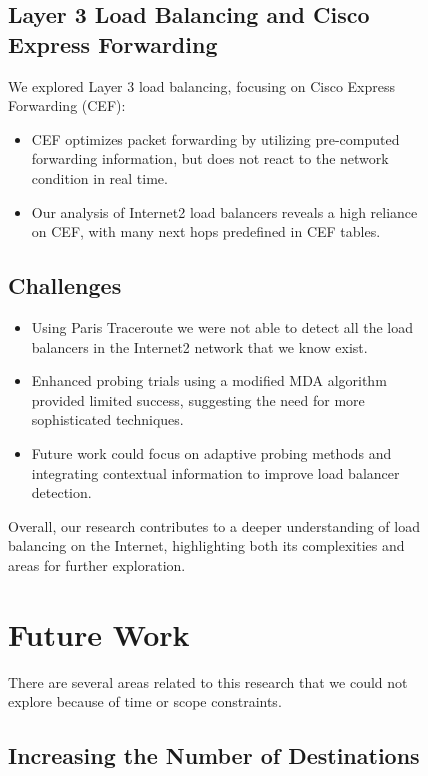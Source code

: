 \documentclass[12pt]{cwru_thesis}
\begin{document}
\begin{figure}[h!]
\begin{itemize}
\end{itemize}

\section*{Layer 3 Load Balancing and Cisco Express Forwarding}

We explored Layer 3 load balancing, focusing on Cisco Express Forwarding (CEF):
\begin{itemize}
    \item CEF optimizes packet forwarding by utilizing pre-computed forwarding information, but does not react to the network condition in real time.
    \item Our analysis of Internet2 load balancers reveals a high reliance on CEF, with many next hops predefined in CEF tables. 
\end{itemize}

\section*{Challenges}

\begin{itemize}
    \item Using Paris Traceroute we were not able to detect all the load balancers in the Internet2 network that we know exist.
    \item Enhanced probing trials using a modified MDA algorithm provided limited success, suggesting the need for more sophisticated techniques.
    \item Future work could focus on adaptive probing methods and integrating contextual information to improve load balancer detection.
\end{itemize}

Overall, our research contributes to a deeper understanding of load balancing on the Internet, highlighting both its complexities and areas for further exploration.

\chapter{Future Work}

There are several areas related to this research that we could not explore because of time or scope constraints. 

\section*{Increasing the Number of Destinations}


\end{figure}
\end{document}
